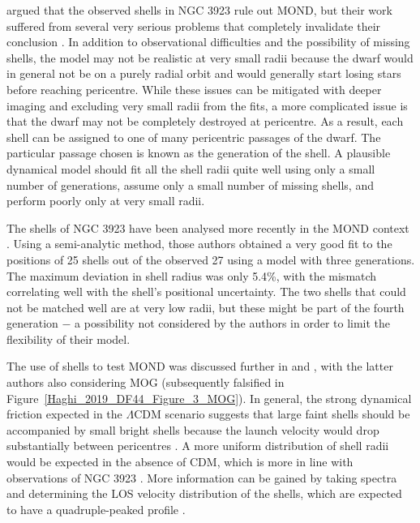 \documentclass[fleqn,usenatbib,useAMS]{mnras} %
\begin{document}
\citet{Hernquist_1987} argued that the observed shells in NGC 3923 rule out MOND, but their work suffered from several very serious problems that completely invalidate their conclusion \citep{Milgrom_1988}. In addition to observational difficulties and the possibility of missing shells, the model may not be realistic at very small radii because the dwarf would in general not be on a purely radial orbit and would generally start losing stars before reaching pericentre. While these issues can be mitigated with deeper imaging and excluding very small radii from the fits, a more complicated issue is that the dwarf may not be completely destroyed at pericentre. As a result, each shell can be assigned to one of many pericentric passages of the dwarf. The particular passage chosen is known as the generation of the shell. A plausible dynamical model should fit all the shell radii quite well using only a small number of generations, assume only a small number of missing shells, and perform poorly only at very small radii.

The shells of NGC 3923 have been analysed more recently in the MOND context \citep{Bilek_2013}. Using a semi-analytic method, those authors obtained a very good fit to the positions of 25 shells out of the observed 27 using a model with three generations. The maximum deviation in shell radius was only 5.4\%, with the mismatch correlating well with the shell's positional uncertainty. The two shells that could not be matched well are at very low radii, but these might be part of the fourth generation $-$ a possibility not considered by the authors in order to limit the flexibility of their model.

The use of shells to test MOND was discussed further in \citet{Bilek_2015} and \citet{Vakili_2017}, with the latter authors also considering MOG (subsequently falsified in Figure~\ref{Haghi_2019_DF44_Figure_3_MOG}). In general, the strong dynamical friction expected in the $\Lambda$CDM scenario suggests that large faint shells should be accompanied by small bright shells because the launch velocity would drop substantially between pericentres \citep{Vakili_2017}. A more uniform distribution of shell radii would be expected in the absence of CDM, which is more in line with observations of NGC 3923 \citep{Bilek_2016}. More information can be gained by taking spectra and determining the LOS velocity distribution of the shells, which are expected to have a quadruple-peaked profile \citep{Bilek_2015_line}.
\end{document}
